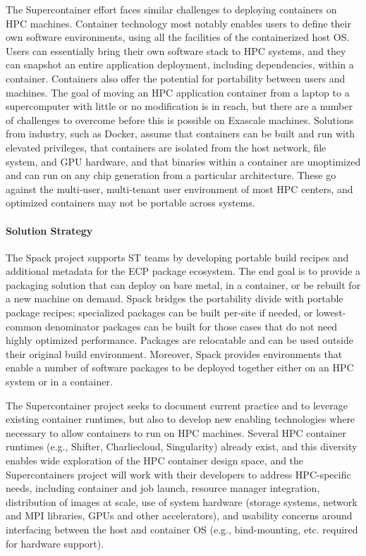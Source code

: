 The Supercontainer effort faces similar challenges to deploying
containers on HPC machines. Container technology most notably enables
users to define their own software environments, using all the facilities
of the containerized host OS.  Users can essentially bring their
own software stack to HPC systems, and they can snapshot an entire
application deployment, including dependencies, within a container.
Containers also offer the potential for portability between users and
machines. The goal of moving an HPC application container from a laptop
to a supercomputer with little or no modification is in reach, but there
are a number of challenges to overcome before this is possible on
Exascale machines.  Solutions from industry, such as Docker, assume that
containers can be built and run with elevated privileges, that containers
are isolated from the host network, file system, and GPU hardware, and
that binaries within a container are unoptimized and can run on any chip
generation from a particular architecture. These go against the
multi-user, multi-tenant user environment of most HPC centers, and
optimized containers may not be portable across systems.

\paragraph{Solution Strategy}

The Spack project supports ST teams by developing portable build recipes
and additional metadata for the ECP package ecosystem.  The end goal is
to provide a packaging solution that can deploy on bare metal, in a
container, or be rebuilt for a new machine on demand. Spack bridges
the portability divide with portable package recipes; specialized
packages can be built per-site if needed, or lowest-common denominator
packages can be built for those cases that do not need highly optimized
performance.  Packages are relocatable and can be used outside their
original build environment.  Moreover, Spack provides environments
that enable a number of software packages to be deployed together either
on an HPC system or in a container.

The Supercontainer project seeks to document current practice and to
leverage existing container runtimes, but also to develop new enabling
technologies where necessary to allow containers to run on HPC machines.
Several HPC container runtimes (e.g., Shifter, Charliecloud, Singularity)
already exist, and this diversity enables wide exploration of the HPC
container design space, and the Supercontainers project will work with
their developers to address HPC-specific needs, including container and
job launch, resource manager integration, distribution of images at
scale, use of system hardware (storage systems, network and MPI
libraries, GPUs and other accelerators), and usability concerns around
interfacing between the host and container OS (e.g., bind-mounting,
etc. required for hardware support).

